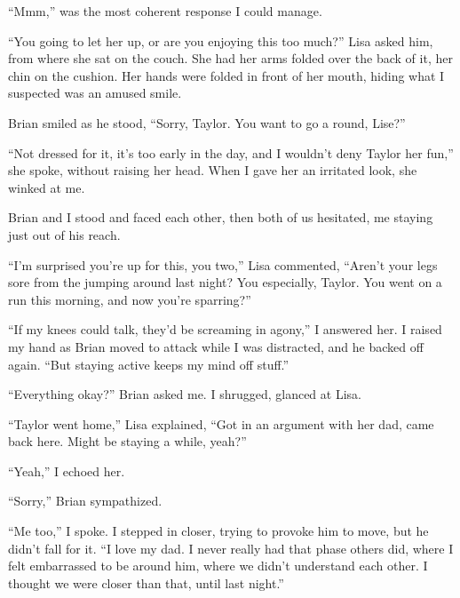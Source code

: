 ``Mmm,'' was the most coherent response I could manage.



``You going to let her up, or are you enjoying this too much?'' Lisa asked him, from where she sat on the couch.  She had her arms folded over the back of it, her chin on the cushion.  Her hands were folded in front of her mouth, hiding what I suspected was an amused smile.



Brian smiled as he stood, ``Sorry, Taylor.  You want to go a round, Lise?''



``Not dressed for it, it's too early in the day, and I wouldn't deny Taylor her fun,'' she spoke, without raising her head.  When I gave her an irritated look, she winked at me.



Brian and I stood and faced each other, then both of us hesitated, me staying just out of his reach.



``I'm surprised you're up for this, you two,'' Lisa commented, ``Aren't your legs sore from the jumping around last night?  You especially, Taylor.  You went on a run this morning, and now you're sparring?''



``If my knees could talk, they'd be screaming in agony,'' I answered her.  I raised my hand as Brian moved to attack while I was distracted, and he backed off again.  ``But staying active keeps my mind off stuff.''



``Everything okay?'' Brian asked me.  I shrugged, glanced at Lisa.



``Taylor went home,'' Lisa explained, ``Got in an argument with her dad, came back here.  Might be staying a while, yeah?''



``Yeah,'' I echoed her.



``Sorry,'' Brian sympathized.



``Me too,'' I spoke.  I stepped in closer, trying to provoke him to move, but he didn't fall for it.  ``I love my dad.  I never really had that phase others did, where I felt embarrassed to be around him, where we didn't understand each other.  I thought we were closer than that, until last night.''



